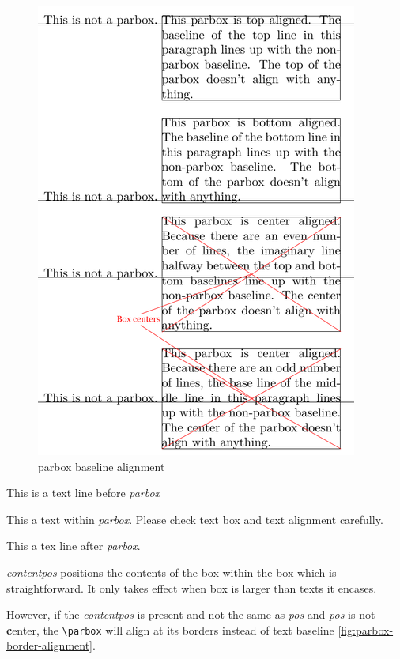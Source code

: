 \begin{figure}[!htb]
  \centering
  \includegraphics{parbox_baseline_alignment}
  \caption{parbox baseline alignment}
  \label{fig:parbox-baseline-alignment}
\end{figure}

This is a text line before \textit{parbox}
\parbox[t][2cm][t]{5cm}{This a text within \textit{parbox}. Please
  check text box and text alignment carefully.} This a tex line
after \textit{parbox}.

\textit{contentpos} positions the contents of the box within the
box which is straightforward. It only takes effect when box is
larger than texts it encases.

However, if the \textit{contentpos} is present and not the same as
\textit{pos} and \textit{pos} is not \textbf{c}enter, the
\verb|\parbox| will align at its borders instead of text baseline
\ref{fig:parbox-border-alignment}.

